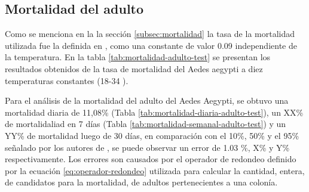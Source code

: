 \subsection{Mortalidad del adulto}
Como se menciona en la la sección \ref{subsec:mortalidad} la tasa de la mortalidad utilizada fue la definida
en \cite{otero2006stochastic}, como una constante de valor 0.09 independiente de la temperatura. En la
tabla \ref{tab:mortalidad-adulto-test} se presentan los resultados obtenidos de la tasa de mortalidad del
Aedes aegypti a diez temperaturas constantes (18-34 \textcelsius).

Para el análisis de la mortalidad del adulto del Aedes Aegypti, se obtuvo una mortalidad diaria de 11,08\%
(Tabla \ref{tab:mortalidad-diaria-adulto-test}), un  XX\% de mortalidaliad en 7 días (Tabla
\ref{tab:mortalidad-semanal-adulto-test}) y un YY\% de mortalidad luego de 30 días, en comparación con el 10\%,
50\% y el 95\% señalado por los autores de \cite{ThironIzcazaJ2003}, se puede observar un error de 1.03 \%,
X\% y Y\%  respectivamente. Los errores son causados por el operador de redondeo definido por la ecuación
\eqref{eq:operador-redondeo} utilizada para calcular la cantidad, entera, de candidatos para la mortalidad, de adultos pertenecientes a una colonía.


